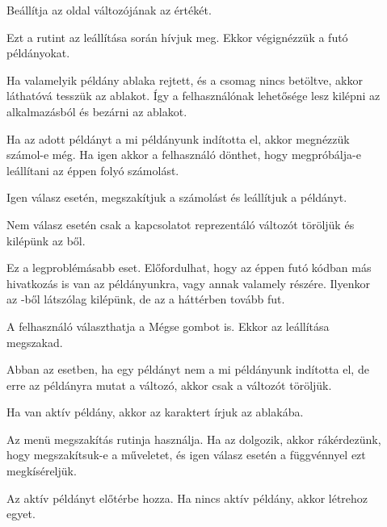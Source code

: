\begin{description}
\item[] 
  Beállítja az  oldal  változójának az értékét.
\item[] Ezt a rutint az  leállítása során
  hívjuk meg. Ekkor 
  végignézzük a futó  példányokat.  

  Ha valamelyik  példány ablaka
  rejtett, és a  csomag nincs betöltve, akkor láthatóvá tesszük az
  ablakot. Így a felhasználónak lehetősége lesz kilépni az 
  alkalmazásból és bezárni az ablakot. 

  Ha az adott  példányt a mi
   példányunk indította el, akkor megnézzük számol-e még. Ha igen
  akkor a felhasználó dönthet, hogy megpróbálja-e leállítani az éppen
  folyó számolást. 

  Igen válasz esetén, megszakítjuk a számolást és
  leállítjuk a  példányt.  

  Nem válasz esetén csak a kapcsolatot
  reprezentáló  változót töröljük és kilépünk az ből. 

  Ez a legproblémásabb eset. Előfordulhat, hogy az éppen futó  kódban
  más hivatkozás is van az  példányunkra, vagy annak valamely
  részére. Ilyenkor az -ből látszólag kilépünk, de az a
  háttérben tovább fut.  

  A felhasználó választhatja a Mégse gombot
  is. Ekkor az  leállítása megszakad.  

  Abban az esetben, ha egy 
  példányt nem a mi  példányunk indította el, de erre az 
  példányra mutat a  változó, akkor csak a  változót
  töröljük.  

\item[] Ha van aktív  példány, akkor az 
  karaktert írjuk az ablakába.
\item[] Az  menü  megszakítás rutinja
  használja. Ha az  dolgozik, akkor rákérdezünk, hogy megszakítsuk-e
  a műveletet, és igen válasz esetén a  függvénnyel ezt 
  megkíséreljük.  
\item[] Az aktív  példányt előtérbe
  hozza. Ha nincs aktív  példány, akkor létrehoz egyet.  


\end{description}
